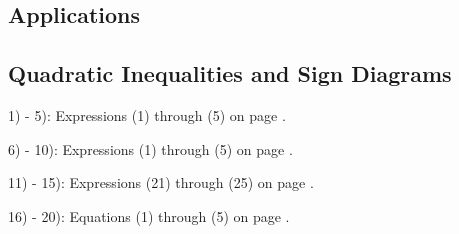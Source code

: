 \newpage

\subsection{Applications}

\newpage

\subsection{Quadratic Inequalities and Sign Diagrams}

{}\pp

1) - 5): Expressions (1) through (5) on page \pageref{ais1}.\pp

6) - 10): Expressions (1) through (5) on page \pageref{aisnot1}.\pp

11) - 15): Expressions (21) through (25) on page \pageref{aisnot1}.\pp

16) - 20): Equations (1) through (5) on page \pageref{QF}.\pp
